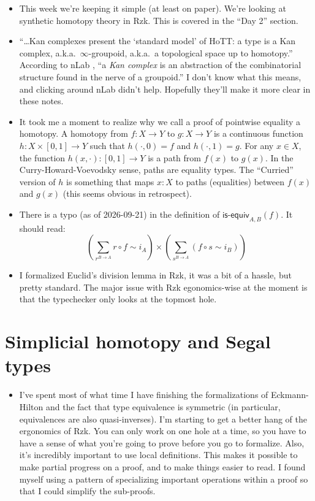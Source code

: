 \documentclass[10pt]{article}
\begin{document}
\begin{itemize}
\item
  This week we're keeping it simple (at least on paper).
  We're looking at synthetic homotopy theory in Rzk.
  This is covered in the \enquote{Day 2} section.
\item
  \enquote{\dots Kan complexes present the \enquote{standard model} of HoTT: a type is a Kan complex, a.k.a.\ $\infty$-groupoid, a.k.a.\ a topological space up to homotopy.}
  According to nLab \cite{nlab-kan-complex}, \enquote{a \textit{Kan complex} is an abstraction of the combinatorial structure found in the nerve of a groupoid.}
  I don't know what this means, and clicking around nLab didn't help.
  Hopefully they'll make it more clear in these notes.
\item
  It took me a moment to realize why we call a proof of pointwise equality a homotopy.
  A homotopy from $f : X \to Y$ to $g : X \to Y$ is a continuous function $h : X \times [0, 1] \to Y$ such that $h(\cdot, 0) = f$ and $h(\cdot, 1) = g$.
  For any $x \in X$, the function $h(x, \cdot) : [0, 1] \to Y$ is a path from $f(x)$ to $g(x)$.
  In the Curry-Howard-Voevodsky sense, paths are equality types.
  The \enquote{Curried} version of $h$ is something that maps $x : X$ to paths (equalities) between $f(x)$ and $g(x)$ (this seems obvious in retrospect).
\item
  There is a typo (as of 2026-09-21) in the definition of $\textsf{is-equiv}_{A, B}(f)$.
  It should read:
  \begin{displaymath}
    \left(\sum_{r^{B \to A}}r \circ f \sim i_A \right) \times \left(\sum_{s^{B \to A}} (f \circ s \sim i_B)\right)
  \end{displaymath}
\item
  I formalized Euclid's division lemma in Rzk, it was a bit of a hassle, but pretty standard.
  The major issue with Rzk egonomics-wise at the moment is that the typechecker only looks at the topmost hole.
\end{itemize}

\section{Simplicial homotopy and Segal types}
\begin{itemize}
\item
  I've spent most of what time I have finishing the formalizations of Eckmann-Hilton and the fact that type equivalence is symmetric (in particular, equivalences are also quasi-inverses).
  I'm starting to get a better hang of the ergonomics of Rzk.
  You can only work on one hole at a time, so you have to have a sense of what you're going to prove before you go to formalize.
  Also, it's incredibly important to use local definitions.
  This makes it possible to make partial progress on a proof, and to make things easier to read.
  I found myself using a pattern of specializing important operations within a proof so that I could simplify the sub-proofs.
\end{itemize}
\end{document}
